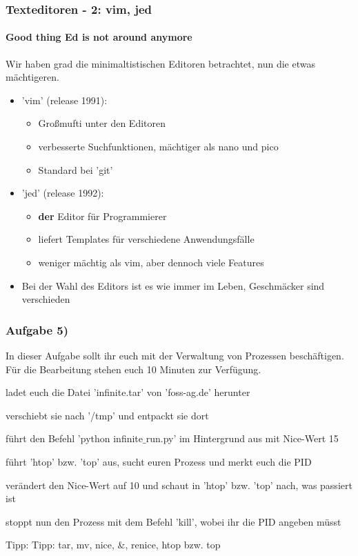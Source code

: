 \documentclass[12pt,utf8]{beamer}
\begin{document}
\begin{frame}
\frametitle{Texteditoren - 2: vim, jed}
\framesubtitle{\textcolor{ownDarkOr}{Good thing Ed is not around anymore}}
Wir haben grad die minimaltistischen Editoren betrachtet, nun die etwas mächtigeren.
\begin{itemize}
	\item 'vim' (release 1991):
	\begin{itemize}[<+->]
		\item Großmufti unter den Editoren
		\item verbesserte Suchfunktionen, mächtiger als nano und pico
		\item Standard bei 'git'
	\end{itemize}
	\item 'jed' (release 1992):
	\begin{itemize}[<+->]
		\item \textbf{der} Editor für Programmierer
		\item liefert Templates für verschiedene Anwendungsfälle
		\item weniger mächtig als vim, aber dennoch viele Features
	\end{itemize}
	\item Bei der Wahl des Editors ist es wie immer im Leben, Geschmäcker sind verschieden
\end{itemize}
\end{frame}

\begin{frame}
\frametitle{Aufgabe 5)}
In dieser Aufgabe sollt ihr euch mit der Verwaltung von Prozessen beschäftigen.
Für die Bearbeitung stehen euch 10 Minuten zur Verfügung.
\begin{itemize}
	{\footnotesize
	\item ladet euch die Datei 'infinite.tar' von 'foss-ag.de' herunter
	\item verschiebt sie nach '/tmp' und entpackt sie dort
	\item führt den Befehl 'python infinite$\_$run.py' im Hintergrund aus mit Nice-Wert 15
	\item führt 'htop' bzw. 'top' aus, sucht euren Prozess und merkt euch die PID
	\item verändert den Nice-Wert auf 10 und schaut in 'htop' bzw. 'top' nach, was passiert ist
	\item stoppt nun den Prozess mit dem Befehl 'kill', wobei ihr die PID angeben müsst
	}
\end{itemize}
{\scriptsize Tipp:  Tipp: tar, mv, nice, \&, renice, htop bzw. top}
\end{frame}
\end{document}
